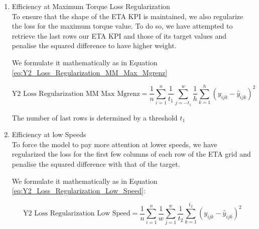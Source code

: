 \documentclass{report} %
\begin{document}
\begin{enumerate}

\item Efficiency at Maximum Torque Loss Regularization \\

To ensure that the shape of the ETA \ac{KPI} is maintained, we also regularize the loss for the maximum torque value.
To do so, we have attempted to retrieve the last rows our ETA \ac{KPI} and those of its target values and penalise the squared difference to have higher weight.

We formulate it mathematically as in Equation \ref{eq:Y2_Loss_Regularization_MM_Max_Mgrenz}

\begin{equation}
    \text{Y2 Loss Regularization MM Max Mgrenz} = \frac{1}{n} \sum_{i=1}^{n} \frac{1}{t_{1}} \sum_{j=-t_{1}}^{w} \frac{1}{h} \sum_{k=1}^{h} (y_{ijk} - \hat{y}_{ijk})^2
    \label{eq:Y2_Loss_Regularization_MM_Max_Mgrenz}
\end{equation}


\vspace{0.2cm} %

The number of last rows is determined by a threshold $t_{1}$

\item Efficiency at low Speeds \\

To force the model to pay more attention at lower speeds, we have regularized the loss for the first few columns of each row of the ETA grid and penalise the squared difference with that of the target.

We formulate it mathematically as in Equation \ref{eq:Y2_Loss_Regularization_Low_Speed}:

\begin{equation}
    \text{Y2 Loss Regularization Low Speed} = \frac{1}{n} \sum_{i=1}^{n} \frac{1}{w} \sum_{j=1}^{w} \frac{1}{t_{2}} \sum_{k=1}^{t_{2}} (y_{ijk} - \hat{y}_{ijk})^2
    \label{eq:Y2_Loss_Regularization_Low_Speed}
\end{equation}


\end{enumerate}
\end{document}

